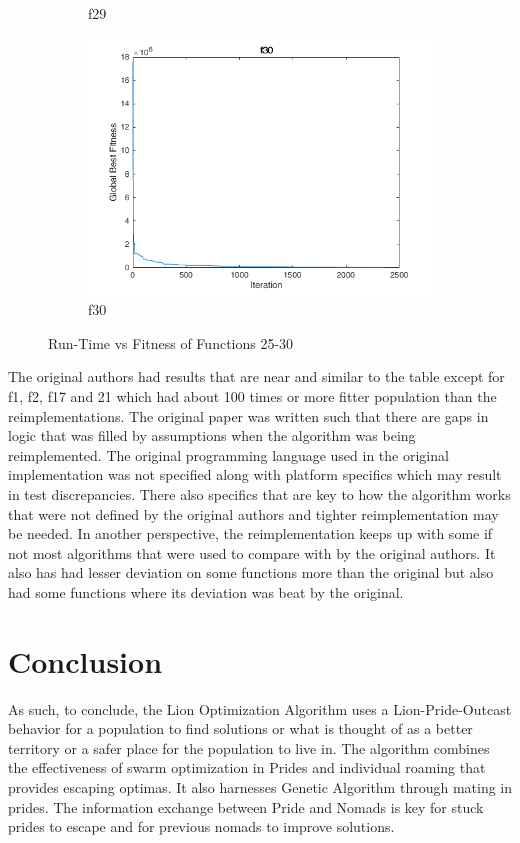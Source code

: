\begin{figure}
\begin{subfigure}[b]{0.4\textwidth}
    \caption{f29}
  \end{subfigure}
  \begin{subfigure}[b]{0.4\textwidth}
    \includegraphics[width=\textwidth]{img/cecrt/f30}
    \caption{f30}
  \end{subfigure}
  \caption{Run-Time vs Fitness of Functions 25-30}
\end{figure}

\clearpage


The original authors had results that are near and similar to the table except for f1, f2, f17 and 21 which had about 100 times or more fitter population than the reimplementations. The original paper was written such that there are gaps in logic that was filled by assumptions when the algorithm was being reimplemented. The original programming language used in the original implementation was not specified along with platform specifics which may result in test discrepancies. There also specifics that are key to how the algorithm works that were not defined by the original authors and tighter reimplementation may be needed. In another perspective, the reimplementation keeps up with some if not most algorithms that were used to compare with by the original authors. It also has had lesser deviation on some functions more than the original but also had some functions where its deviation was beat by the original.

\section{Conclusion}

As such, to conclude, the Lion Optimization Algorithm uses a Lion-Pride-Outcast behavior for a population to find solutions or what is thought of as a better territory or a safer place for the population to live in. The algorithm combines the effectiveness of swarm optimization in Prides and individual roaming that provides escaping optimas. It also harnesses Genetic Algorithm through mating in prides. The information exchange between Pride and Nomads is key for stuck prides to escape and for previous nomads to improve solutions.
